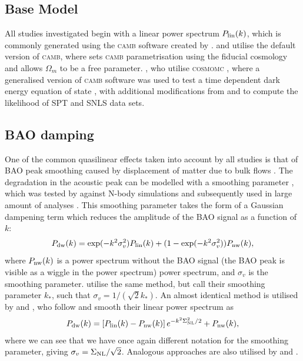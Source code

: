 \documentclass[titlesmallcaps, examinerscopy, copyrightpage]{uqthesis}
\newcommand{\camb}{\textsc{camb}}
\newcommand{\cosmomc}{\textsc{cosmomc}}
\begin{document}
\subsection{Base Model}
All studies investigated begin with a linear power spectrum $P_{\rm{lin}}(k)$, which is commonly generated using the \camb{} software created by \citet{Lewis2000}. \citet{ChuangWang2012} and \citet{BlakeDavis2011} utilise the default version of \camb{}, where \citet{BlakeDavis2011} sets \camb{} parametrisation using the fiducial cosmology and allows $\Omega_m$ to be a free parameter. \citet{SanchezScoccola2012}, who utilise  \cosmomc{} \citep{LewisBridle2002}, where a generalised version of \camb{} software was used to test a time dependent dark energy equation of state \citep{FangHuLewis2008}, with additional modifications from \citet{KeislerReichardt2011} and \citet{ConleyGuySullivan2011} to compute the likelihood of SPT and SNLS data sets.


\subsection{BAO damping}

One of the common quasilinear effects taken into account by all studies is that of BAO peak smoothing caused by displacement of matter due to bulk flows \citep{EisensteinSeoWhite2007,CrocceScoccimarro2008,Matsubara2008,CrocceScoccimarro2006}. The degradation in the acoustic peak can be modelled with a smoothing parameter \citep{CrocceScoccimarro2008}, which was tested by \citet{SanchezBaughAngulo2008} against N-body simulations and subsequently used in large amount of analyses \citet{BlakeDavis2011,EisensteinZehavi2005,Sanchez2009,BeutlerBlake2011}. This smoothing parameter takes the form of a Gaussian dampening term which reduces the amplitude of the BAO signal as a function of $k$:
\begin{align} \label{{eq:blake1}}
P_{\rm{dw}}(k) = \exp(-k^2 \sigma_v^2) P_{\rm{lin}}(k) + (1 - \exp(-k^2 \sigma_v^2)) P_{\rm{nw}}(k),
\end{align}
where $P_{\rm{nw}}(k)$ is a power spectrum without the BAO signal (the BAO peak is visible as a wiggle in the power spectrum) power spectrum, and $\sigma_v$ is the smoothing parameter. \citet{ChuangWang2012} utilise the same method, but call their smoothing parameter $k_*$, such that $\sigma_v = 1/(\sqrt{2} k_*)$. An almost identical method is utilised by \citep{AndersonAubourg2012} and \citet{XuPadmanabhan2012}, who follow \citet{EisensteinSeoWhite2007} and smooth their linear power spectrum as
\begin{align}
P_{\rm{dw}}(k) = \left[ P_{\rm{lin}}(k) - P_{\rm{nw}}(k) \right] e^{-k^2 \Sigma_{\rm{NL}}^2 / 2} + P_{\rm{nw}}(k),
\end{align}
where we can see that we have once again different notation for the smoothing parameter, giving $\sigma_v = \Sigma_{\rm{NL}} / \sqrt{2}$. Analogous approaches are also utilised by \citet{MontesanoSanchezPhelps2012} and \citet{SanchezScoccola2012}.
\end{document}
